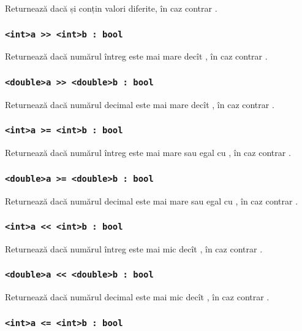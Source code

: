 Returnează \true{} dacă  și  conțin valori diferite, în caz contrar \false{}.

\subsubsection{\lstinline|<int>a >> <int>b : bool|}

Returnează \true{} dacă numărul întreg  este mai mare decît , în caz contrar \false{}.

\subsubsection{\lstinline|<double>a >> <double>b : bool|}

Returnează \true{} dacă numărul decimal  este mai mare decît , în caz contrar \false{}.

\subsubsection{\lstinline|<int>a >= <int>b : bool|}

Returnează \true{} dacă numărul întreg  este mai mare sau egal cu , în caz contrar \false{}.

\subsubsection{\lstinline|<double>a >= <double>b : bool|}

Returnează \true{} dacă numărul decimal  este mai mare sau egal cu , în caz contrar \false{}.

\subsubsection{\lstinline|<int>a << <int>b : bool|}

Returnează \true{} dacă numărul întreg  este mai mic decît , în caz contrar \false{}.

\subsubsection{\lstinline|<double>a << <double>b : bool|}

Returnează \true{} dacă numărul decimal  este mai mic decît , în caz contrar \false{}.

\subsubsection{\lstinline|<int>a <= <int>b : bool|}

